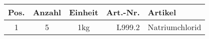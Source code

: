\begin{longtable}{cccrX}
Pos. & Anzahl & Einheit & Art.-Nr. & Artikel\\
\endhead
\hline

1 & 5 & 1kg & L999.2 & Natriumchlorid\\

\end{longtable}